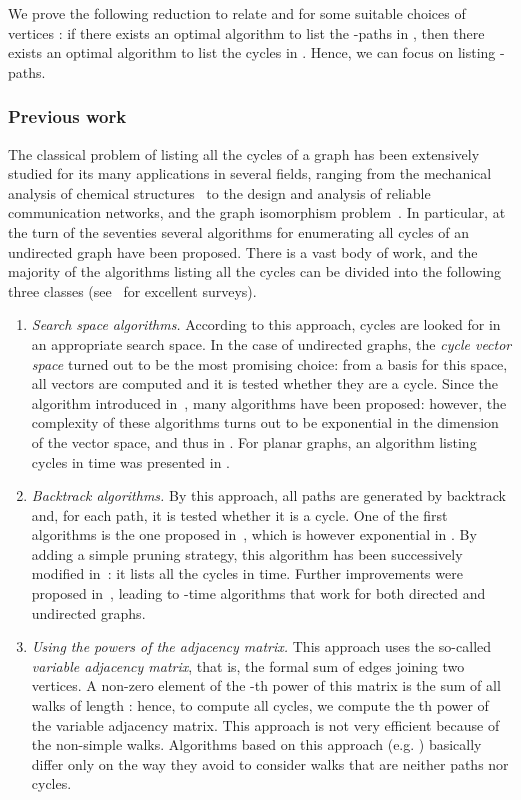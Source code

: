 We prove the following reduction to relate
 and  for some suitable choices
of vertices : if there exists an optimal algorithm to list the
-paths in , then there exists an optimal algorithm to list the
cycles in .  Hence, we can focus on listing -paths.

\subsubsection{Previous work}

The classical problem of listing all the cycles of a graph has been
extensively studied for its many applications in several fields,
ranging from the mechanical analysis of chemical
structures~\cite{Sussenguth65} to the design and analysis of reliable
communication networks, and the graph isomorphism
problem~\cite{Welch66}.
In particular, at the turn of the seventies several algorithms for
enumerating all cycles of an undirected graph have been proposed.
There is a vast body of work, and the majority of the algorithms
listing all the cycles can be divided into the following three classes
(see~\cite{Bezem87,Mateti76} for excellent surveys).

\begin{enumerate}
\item \textit{Search space algorithms.}
According to this approach, cycles are looked for in an appropriate
search space.  In the case of undirected graphs, the \emph{cycle
vector space} \cite{Diestel} turned out to be the most promising
choice: from a basis for this space, all vectors are computed and it
is tested whether they are a cycle. Since the algorithm introduced
in~\cite{Welch66}, many algorithms have been proposed: however, the
complexity of these algorithms turns out to be exponential in the
dimension of the vector space, and thus in . For planar graphs, an
algorithm listing cycles in  time was presented in
\cite{Syslo81}.

\item \textit{Backtrack algorithms.} 
By this approach, all paths are generated by backtrack and, for each
path, it is tested whether it is a cycle. One of the first algorithms
is the one proposed in~\cite{Tiernan70}, which is however exponential
in . By adding a simple pruning strategy, this algorithm has
been successively modified in~\cite{Tarjan73}: it lists all the cycles
in  time. Further improvements were proposed
in~\cite{Johnson1975,Szwarcfiter76,Read75}, leading to
-time algorithms that work for both directed and
undirected graphs. 


\item \textit{Using the powers of the adjacency matrix.} 
This approach uses the so-called \emph{variable adjacency matrix},
that is, the formal sum of edges joining two vertices. A non-zero
element of the -th power of this matrix is the sum of all walks of
length : hence, to compute all cycles, we compute the th power
of the variable adjacency matrix. This approach is not very efficient
because of the non-simple walks. Algorithms based on this approach
(e.g.\mbox{} \cite{Ponstein66,Yau67}) basically differ only on the way
they avoid to consider walks that are neither paths nor cycles.
\end{enumerate}

